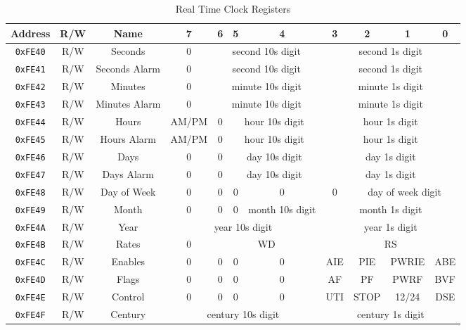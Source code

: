 \begin{table}[ht]
	\begin{center}
		\begin{tabular}{| c | c | c || c | c | c | c | c | c | c | c |} \hline
			Address & R/W & Name & 7 & 6 & 5 & 4 & 3 & 2 & 1 & 0 \\ \hline\hline
			\verb+0xFE40+ & R/W & Seconds & 0 & \multicolumn{3}{|c|}{second 10s digit} & \multicolumn{4}{|c|}{second 1s digit} \\ \hline
            \verb+0xFE41+ & R/W & Seconds Alarm & 0 & \multicolumn{3}{|c|}{second 10s digit} & \multicolumn{4}{|c|}{second 1s digit} \\ \hline
            \verb+0xFE42+ & R/W & Minutes & 0 & \multicolumn{3}{|c|}{minute 10s digit} & \multicolumn{4}{|c|}{minute 1s digit} \\ \hline
            \verb+0xFE43+ & R/W & Minutes Alarm & 0 & \multicolumn{3}{|c|}{minute 10s digit} & \multicolumn{4}{|c|}{minute 1s digit} \\ \hline
            \verb+0xFE44+ & R/W & Hours & AM/PM & 0 & \multicolumn{2}{|c|}{hour 10s digit} & \multicolumn{4}{|c|}{hour 1s digit} \\ \hline
            \verb+0xFE45+ & R/W & Hours Alarm & AM/PM & 0 & \multicolumn{2}{|c|}{hour 10s digit} & \multicolumn{4}{|c|}{hour 1s digit} \\ \hline
            \verb+0xFE46+ & R/W & Days & 0 & 0 & \multicolumn{2}{|c|}{day 10s digit} & \multicolumn{4}{|c|}{day 1s digit} \\ \hline
            \verb+0xFE47+ & R/W & Days Alarm & 0 & 0 & \multicolumn{2}{|c|}{day 10s digit} & \multicolumn{4}{|c|}{day 1s digit} \\ \hline
            \verb+0xFE48+ & R/W & Day of Week & 0 & 0 & 0 & 0 & 0 & \multicolumn{3}{|c|}{day of week digit} \\ \hline
            \verb+0xFE49+ & R/W & Month & 0 & 0 & 0 & month 10s digit & \multicolumn{4}{|c|}{month 1s digit} \\ \hline
            \verb+0xFE4A+ & R/W & Year & \multicolumn{4}{|c|}{year 10s digit} & \multicolumn{4}{|c|}{year 1s digit}  \\ \hline
            \verb+0xFE4B+ & R/W & Rates & 0 & \multicolumn{3}{|c|}{WD} & \multicolumn{4}{|c|}{RS} \\ \hline
            \verb+0xFE4C+ & R/W & Enables & 0 & 0 & 0 & 0 & AIE & PIE & PWRIE & ABE \\ \hline
            \verb+0xFE4D+ & R/W & Flags & 0 & 0 & 0 & 0 & AF & PF & PWRF & BVF \\ \hline
            \verb+0xFE4E+ & R/W & Control & 0 & 0 & 0 & 0 & UTI & STOP & 12/24 & DSE \\ \hline
            \verb+0xFE4F+ & R/W & Century & \multicolumn{4}{|c|}{century 10s digit} & \multicolumn{4}{|c|}{century 1s digit}  \\ \hline
		\end{tabular}
	\end{center}
	\caption{Real Time Clock Registers}
	\label{tab:rtc_registers}
\end{table}

